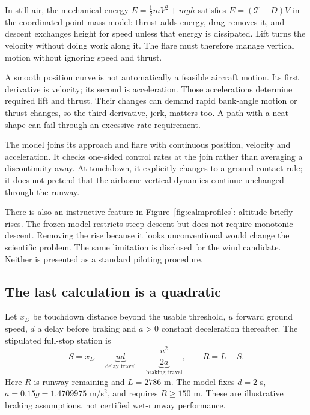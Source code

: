 In still air, the mechanical energy $E=\tfrac12mV^2+mgh$ satisfies $\dot E=(\mathcal T-D)V$ in the coordinated point-mass model: thrust adds energy, drag removes it, and descent exchanges height for speed unless that energy is dissipated. Lift turns the velocity without doing work along it. The flare must therefore manage vertical motion without ignoring speed and thrust.

A smooth position curve is not automatically a feasible aircraft motion. Its first derivative is velocity; its second is acceleration. Those accelerations determine required lift and thrust. Their changes can demand rapid bank-angle motion or thrust changes, so the third derivative, jerk, matters too. A path with a neat shape can fail through an excessive rate requirement.

The model joins its approach and flare with continuous position, velocity and acceleration. It checks one-sided control rates at the join rather than averaging a discontinuity away. At touchdown, it explicitly changes to a ground-contact rule; it does not pretend that the airborne vertical dynamics continue unchanged through the runway.

There is also an instructive feature in Figure~\ref{fig:calmprofiles}: altitude briefly rises. The frozen model restricts steep descent but does not require monotonic descent. Removing the rise because it looks unconventional would change the scientific problem. The same limitation is disclosed for the wind candidate. Neither is presented as a standard piloting procedure.
\par\medskip
\subsection*{The last calculation is a quadratic}
Let $x_D$ be touchdown distance beyond the usable threshold, $u$ forward ground speed, $d$ a delay before braking and $a>0$ constant deceleration thereafter. The stipulated full-stop station is
\begin{equation}
S=x_D+\underbrace{ud}_{\text{delay travel}}+\underbrace{\frac{u^2}{2a}}_{\text{braking travel}},\qquad R=L-S.
\label{eq:stop}
\end{equation}
Here $R$ is runway remaining and $L=2786$ m. The model fixes $d=2$ s, $a=0.15g=1.4709975$ m/s$^2$, and requires $R\geq150$ m. These are illustrative braking assumptions, not certified wet-runway performance.


